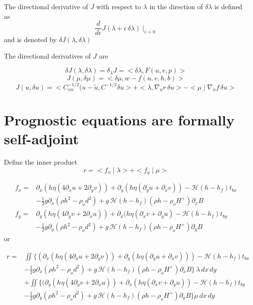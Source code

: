 \documentclass[10pt,a4paper]{book}
\newcommand{\He}{\mathcal{H}}
\newcommand{\p}{\partial}
\newcommand{\tbx}{t_{bx}}
\newcommand{\tby}{t_{by}}
\begin{document}
The directional derivative of $J$ with respect to $\lambda$ in the direction of $\delta \lambda$ is defined as
\[ \frac{d}{d \epsilon} J(\lambda+\epsilon \, \delta \lambda)\mid_{\epsilon=0}\] and is denoted by $\delta J(\lambda,\delta \lambda)$


The directional derivatives of $J$ are

\[ \delta J(\lambda,\delta \lambda) = \delta_{\lambda} J =<\delta \lambda,F(u,v,p)> \]
\[ J(\mu,\delta \mu) =<\delta \mu, w-f(u,v,h,b)> \]
\[ J(u,\delta u)=<C^{-1/2}_{uu} (u-\tilde{u},C^{-1/2} \delta u > + < \lambda, \nabla_u r \, \delta u>-<\mu\mid \nabla_u f \, \delta u> \]


\section{Prognostic equations are formally self-adjoint}



Define the inner product
\[
r=< f_x\mid \lambda> + <f_y\mid \mu>
\]



\begin{align} 
f_x=&\p_x ( h \eta ( 4 \p_x u + 2 \p_y v)) + \p_y ( h \eta (\p_y u + \p_x v) ) - \He(h-h_f) \tbx  \nonumber \\
&-\frac{1}{2} g \p_x (\rho h^2 - \rho_o d^2)+ g\,\He(h-h_f) (\rho h -\rho_o H^{+}) \p_x B 
\label{eq:A1x}\\
f_y=&\p_y (  h \eta ( 4 \p_y v + 2 \p_x u )) +\p_x ( h \eta (\p_x v + \p_y u ) - \He(h-h_f) \tby  \nonumber \\
&-\frac{1}{2} g \p_y (\rho h^2 - \rho_o d^2)+g\,\He(h-h_f) (\rho h -\rho_o H^{+}) \p_y B
\label{eq:A1y}
\end{align}
or

\begin{align*}
r=& \iint  \big \{ ( \p_x ( h \eta ( 4 \p_x u + 2 \p_y v)) + \p_y ( h \eta (\p_y u + \p_x v) )) - \He(h-h_f) \tbx   \nonumber \\
&-\frac{1}{2} g \p_x (\rho h^2 - \rho_o d^2)+ g\,\He(h-h_f) (\rho h -\rho_o H^{+}) \p_x B \big \} \, \lambda \, dx \, dy \nonumber \\
&+ \iint \big \{ (\p_y (  h \eta ( 4 \p_y v + 2 \p_x u )) +\p_x ( h \eta (\p_x v + \p_y u ) ) - \He(h-h_f) \tby  \nonumber \\
&-\frac{1}{2} g \p_y (\rho h^2 - \rho_o d^2)+g\,\He(h-h_f) (\rho h -\rho_o H^{+}) \p_y B \big \} \mu \, dx \, dy
\end{align*}
\end{document}
